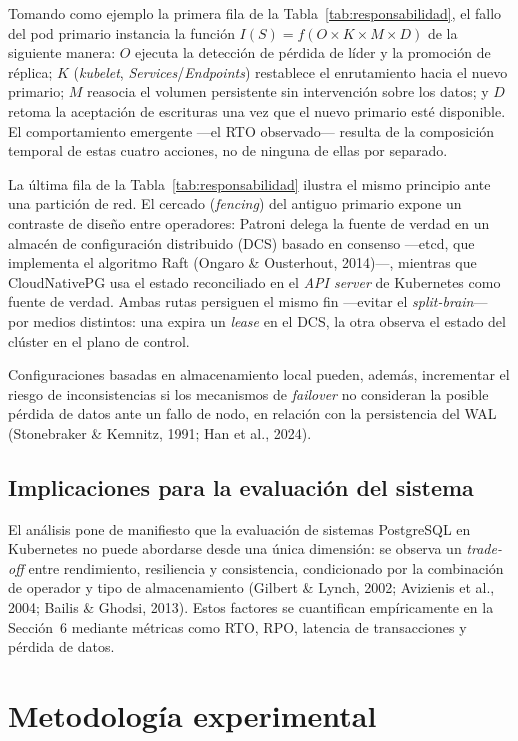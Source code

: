 \documentclass[12pt,twocolumn,letterpaper]{article}
\begin{document}
Tomando como ejemplo la primera fila de la Tabla~\ref{tab:responsabilidad}, el fallo del pod primario instancia la función $I(S)=f(O\times K\times M\times D)$ de la siguiente manera: $O$ ejecuta la detección de pérdida de líder y la promoción de réplica; $K$ (\textit{kubelet}, \textit{Services}/\textit{Endpoints}) restablece el enrutamiento hacia el nuevo primario; $M$ reasocia el volumen persistente sin intervención sobre los datos; y $D$ retoma la aceptación de escrituras una vez que el nuevo primario esté disponible. El comportamiento emergente —el RTO observado— resulta de la composición temporal de estas cuatro acciones, no de ninguna de ellas por separado.

La última fila de la Tabla~\ref{tab:responsabilidad} ilustra el mismo principio ante una partición de red. El cercado (\textit{fencing}) del antiguo primario expone un contraste de diseño entre operadores: Patroni delega la fuente de verdad en un almacén de configuración distribuido (DCS) basado en consenso —etcd, que implementa el algoritmo Raft (Ongaro \& Ousterhout, 2014)—, mientras que CloudNativePG usa el estado reconciliado en el \textit{API server} de Kubernetes como fuente de verdad. Ambas rutas persiguen el mismo fin —evitar el \textit{split-brain}— por medios distintos: una expira un \textit{lease} en el DCS, la otra observa el estado del clúster en el plano de control.

Configuraciones basadas en almacenamiento local pueden, además, incrementar el riesgo de inconsistencias si los mecanismos de \textit{failover} no consideran la posible pérdida de datos ante un fallo de nodo, en relación con la persistencia del WAL (Stonebraker \& Kemnitz, 1991; Han et al., 2024).

\subsection{Implicaciones para la evaluación del sistema}
El análisis pone de manifiesto que la evaluación de sistemas PostgreSQL en Kubernetes no puede abordarse desde una única dimensión: se observa un \textit{trade-off} entre rendimiento, resiliencia y consistencia, condicionado por la combinación de operador y tipo de almacenamiento (Gilbert \& Lynch, 2002; Avizienis et al., 2004; Bailis \& Ghodsi, 2013). Estos factores se cuantifican empíricamente en la Sección~6 mediante métricas como RTO, RPO, latencia de transacciones y pérdida de datos.

\section{Metodología experimental}
\end{document}
